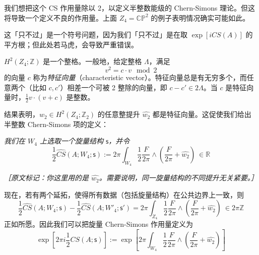 我们想把这个 CS 作用量除以 2，以定义半整数能级的 Chern-Simons 理论。但这将导致一个定义不良的作用量。上面 $Z_4=\mathbb{CP}^2$ 的例子表明情况确实可能如此。

这「只不过」是一个符号问题，因为我们「只不过」是在取 $\exp[iCS(A)]$ 的平方根；但此处若马虎，会导致严重错误。

$H^2(Z_4;\mathbb{Z})$ 是一个整格。一般地，给定整格 $\Lambda$，满足
\begin{equation}
  v^2=c\cdot v\mod 2
  \tag{2.350}
  \label{eq:2.350}
\end{equation}
的向量 $c$ 称为\emph{特征向量}（characteristic vector）。特征向量总是有无穷多个，而任意两个（比如 $c,c'$）相差一个可被 2 整除的向量，即 $c-c'\in2\Lambda$。当 $c$ 是特征向量时，$\frac12v\cdot(v+c)$ 是整数。

结果表明，$w_2\in H^2(Z_4;\mathbb{Z}_2)$ 的任意整提升 $\widehat{w_2}$ 都是特征向量。这促使我们给出半整数 Chern-Simons 项的定义：

\emph{我们在 $W_4$ 上选取一个旋量结构 $\mathsf{s}$，并令}
\begin{equation}
  \frac12\widehat{CS}(A;W_4;\mathsf{s})
  :=2\pi\int_{W_4}\frac12\frac{F}{2\pi}\wedge\left(\frac{F}{2\pi}+\widehat{w_2}\right)\ \in\mathbb{R}
  \tag{2.351}
  \label{eq:2.351}
\end{equation}

{\small\itshape ［原文标记：你这里用的是 $\widehat{w_2}$。需要说明，同一旋量结构的不同提升无关紧要。］}

现在，若有两个延拓，使得所有数据（包括旋量结构）在公共边界上一致，则
\begin{equation}
  \frac12\widehat{CS}(A;W_4;\mathsf{s})-\frac12\widehat{CS}(A;W'_4;\mathsf{s}')
  =2\pi\int_{Z_4}\frac12\frac{F}{2\pi}\wedge\left(\frac{F}{2\pi}+\widehat{w_2}\right)\ \in2\pi\mathbb{Z}
  \tag{2.352}
  \label{eq:2.352}
\end{equation}
正如所愿。因此我们可以把旋量 Chern-Simons 作用量定义为
\begin{equation}
  \exp\left[2\pi i\frac12CS(A;\mathsf{s})\right]
  :=\exp\left[2\pi\int_{W_4}\frac12\frac{F}{2\pi}\wedge\left(\frac{F}{2\pi}+\widehat{w_2}\right)\right]
  \tag{2.353}
  \label{eq:2.353}
\end{equation}

